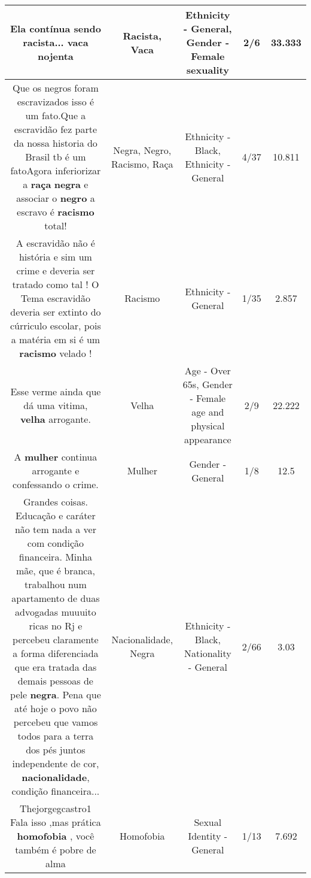 \documentclass[11pt]{article}
\newlength\mylength
\begin{document}
\begin{center}
\begin{longtable}{|C{.65\mylength}|C{.30\mylength}|C{.12\mylength}|C{.12\mylength}|C{.12\mylength}|}
  \small Ela contínua sendo \textbf{racista}... \textbf{vaca} nojenta\normalsize   & Racista, Vaca & Ethnicity - General, Gender - Female sexuality & 2/6 & 33.333 \\  \hline
  \small Que os negros foram escravizados isso é um fato.Que a escravidão fez parte da nossa historia do Brasil tb é um fatoAgora inferiorizar a \textbf{raça} \textbf{negra} e associar o \textbf{negro} a escravo é \textbf{racismo} total!\normalsize   & Negra, Negro, Racismo, Raça & Ethnicity - Black, Ethnicity - General & 4/37 & 10.811 \\  \hline
  \small A escravidão não é história e sim um crime e deveria ser tratado como tal ! O Tema escravidão deveria ser extinto do cúrriculo escolar, pois a matéria em si é um \textbf{racismo} velado !\normalsize   & Racismo & Ethnicity - General & 1/35 & 2.857 \\  \hline
  \small Esse verme ainda que dá uma vitima, \textbf{v\textbf{elha}} arrogante.\normalsize   & Velha & Age - Over 65s, Gender - Female age and physical appearance & 2/9 & 22.222 \\  \hline
  \small A \textbf{mulher} continua arrogante e confessando o crime.\normalsize   & Mulher & Gender - General & 1/8 & 12.5 \\  \hline
  \small Grandes coisas. Educação e caráter não tem nada a ver com condição financeira. Minha mãe, que é branca, trabalhou num apartamento de duas advogadas muuuito ricas no Rj e percebeu claramente a forma diferenciada que era tratada das demais pessoas de pele \textbf{negra}. Pena que até hoje o povo não percebeu que vamos todos para a terra dos pés juntos independente de cor, \textbf{nacionalidade}, condição financeira...\normalsize   & Nacionalidade, Negra & Ethnicity - Black, Nationality - General & 2/66 & 3.03 \\  \hline
  \small Thejorgegcastro1 Fala isso ,mas prática \textbf{homofobia} , você também é pobre de alma\normalsize   & Homofobia & Sexual Identity - General & 1/13 & 7.692 \\  \hline

\end{longtable}
\end{center}
\end{document}
